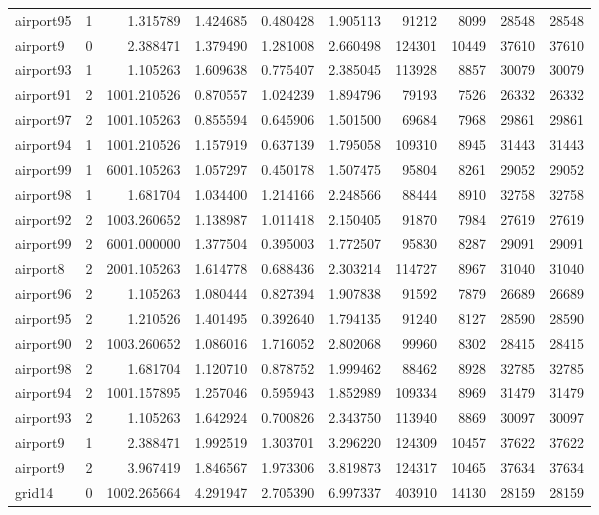\begin{longtable}{|l|r|r|r|r|r|r|r|r|r|}
airport95 & 1 & 1.315789 & 1.424685 & 0.480428 & 1.905113 & 91212 & 8099 & 28548 & 28548 \\
airport9 & 0 & 2.388471 & 1.379490 & 1.281008 & 2.660498 & 124301 & 10449 & 37610 & 37610 \\
airport93 & 1 & 1.105263 & 1.609638 & 0.775407 & 2.385045 & 113928 & 8857 & 30079 & 30079 \\
airport91 & 2 & 1001.210526 & 0.870557 & 1.024239 & 1.894796 & 79193 & 7526 & 26332 & 26332 \\
airport97 & 2 & 1001.105263 & 0.855594 & 0.645906 & 1.501500 & 69684 & 7968 & 29861 & 29861 \\
airport94 & 1 & 1001.210526 & 1.157919 & 0.637139 & 1.795058 & 109310 & 8945 & 31443 & 31443 \\
airport99 & 1 & 6001.105263 & 1.057297 & 0.450178 & 1.507475 & 95804 & 8261 & 29052 & 29052 \\
airport98 & 1 & 1.681704 & 1.034400 & 1.214166 & 2.248566 & 88444 & 8910 & 32758 & 32758 \\
airport92 & 2 & 1003.260652 & 1.138987 & 1.011418 & 2.150405 & 91870 & 7984 & 27619 & 27619 \\
airport99 & 2 & 6001.000000 & 1.377504 & 0.395003 & 1.772507 & 95830 & 8287 & 29091 & 29091 \\
airport8 & 2 & 2001.105263 & 1.614778 & 0.688436 & 2.303214 & 114727 & 8967 & 31040 & 31040 \\
airport96 & 2 & 1.105263 & 1.080444 & 0.827394 & 1.907838 & 91592 & 7879 & 26689 & 26689 \\
airport95 & 2 & 1.210526 & 1.401495 & 0.392640 & 1.794135 & 91240 & 8127 & 28590 & 28590 \\
airport90 & 2 & 1003.260652 & 1.086016 & 1.716052 & 2.802068 & 99960 & 8302 & 28415 & 28415 \\
airport98 & 2 & 1.681704 & 1.120710 & 0.878752 & 1.999462 & 88462 & 8928 & 32785 & 32785 \\
airport94 & 2 & 1001.157895 & 1.257046 & 0.595943 & 1.852989 & 109334 & 8969 & 31479 & 31479 \\
airport93 & 2 & 1.105263 & 1.642924 & 0.700826 & 2.343750 & 113940 & 8869 & 30097 & 30097 \\
airport9 & 1 & 2.388471 & 1.992519 & 1.303701 & 3.296220 & 124309 & 10457 & 37622 & 37622 \\
airport9 & 2 & 3.967419 & 1.846567 & 1.973306 & 3.819873 & 124317 & 10465 & 37634 & 37634 \\
grid14 & 0 & 1002.265664 & 4.291947 & 2.705390 & 6.997337 & 403910 & 14130 & 28159 & 28159 \\

\end{longtable}
